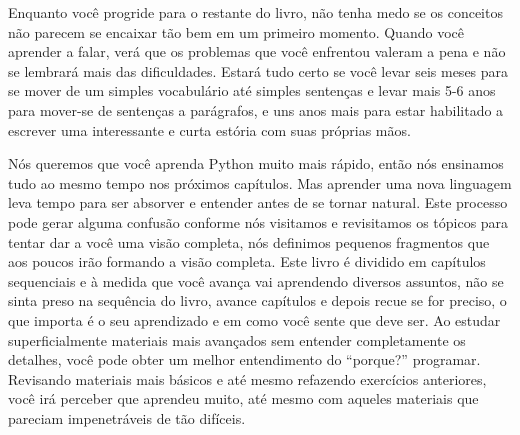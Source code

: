 Enquanto você progride para o restante do livro, não tenha medo se os conceitos
não parecem se encaixar tão bem em um primeiro momento. Quando você aprender a falar,
verá que os problemas que você enfrentou valeram a pena e não se lembrará mais das
dificuldades. Estará tudo certo se você levar seis meses para se mover de um simples
vocabulário até simples sentenças e levar mais 5-6 anos para mover-se de sentenças a
parágrafos, e uns anos mais para estar habilitado a escrever uma interessante e curta
estória com suas próprias mãos.
%

Nós queremos que você aprenda Python muito mais rápido, então nós ensinamos tudo ao
mesmo tempo nos próximos capítulos.
Mas aprender uma nova linguagem leva tempo para ser absorver e entender antes de
se tornar natural.
Este processo pode gerar alguma confusão conforme nós visitamos e revisitamos os
tópicos para tentar dar a você uma visão completa, nós definimos pequenos
fragmentos que aos poucos irão formando a visão completa. Este livro é dividido
em capítulos sequenciais e à medida que você avança vai aprendendo diversos assuntos,
não se sinta preso na sequência do livro, avance capítulos e depois recue se for
preciso, o que importa é o seu aprendizado e em como você sente que deve ser.
Ao estudar superficialmente materiais mais avançados sem entender completamente
os detalhes, você pode obter um melhor entendimento do ``porque?'' programar.
Revisando materiais mais básicos e até mesmo refazendo exercícios anteriores,
você irá perceber que aprendeu muito, até mesmo com aqueles materiais que pareciam
impenetráveis de tão difíceis.
%

